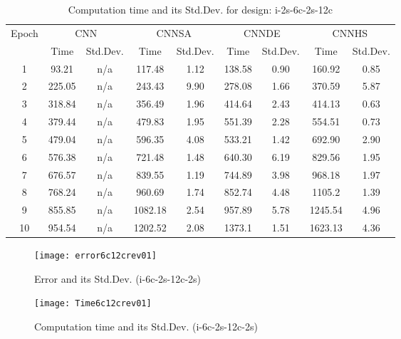 \documentclass[10pt,letterpaper]{article}
\begin{document}
\begin{table}[]
\small
\caption{Computation time and its Std.Dev. for design: i-2s-6c-2s-12c}
\label{tab:my_label}

\begin{tabular}{c c c c c c c c c}
\hline
\multicolumn{1}{c}{\multirow{2}{*}{Epoch}} & \multicolumn{2}{c}{CNN} &
\multicolumn{2}{c}{CNNSA} & \multicolumn{2}{c}{CNNDE} & \multicolumn{2}{c}{CNNHS}\\
\cline{2-9}

\multicolumn{1}{r}{}       & \multicolumn{1}{c}{Time} & \multicolumn{1}{c}{Std.Dev.} &
\multicolumn{1}{c}{Time} & \multicolumn{1}{c}{Std.Dev.}  & \multicolumn{1}{c}{Time} &
\multicolumn{1}{c}{Std.Dev.} & \multicolumn{1}{c}{Time} & \multicolumn{1}{c}{Std.Dev.} \\
\hline

1		& 93.21  & n/a    & 117.48  & 1.12  & 138.58  & 0.90    & 160.92  & 0.85  \\
2 		& 225.05 & n/a    & 243.43  & 9.90  & 278.08  & 1.66    & 370.59  & 5.87  \\
3		& 318.84 & n/a    & 356.49  & 1.96  & 414.64  & 2.43    & 414.13  & 0.63  \\
4		& 379.44 & n/a    & 479.83  & 1.95  & 551.39  & 2.28 	& 554.51  & 0.73  \\
5		& 479.04 & n/a    & 596.35  & 4.08  & 533.21  & 1.42    & 692.90  & 2.90  \\
6		& 576.38 & n/a    & 721.48  & 1.48  & 640.30  & 6.19    & 829.56  & 1.95  \\
7 		& 676.57 & n/a    & 839.55  & 1.19  & 744.89  & 3.98    & 968.18  & 1.97  \\
8		& 768.24 & n/a    & 960.69  & 1.74  & 852.74  & 4.48    & 1105.2  & 1.39  \\
9		& 855.85 & n/a    & 1082.18 & 2.54  & 957.89  & 5.78    & 1245.54 & 4.96  \\
10		& 954.54 & n/a    & 1202.52 & 2.08  & 1373.1  & 1.51    & 1623.13 & 4.36 \\

\hline
\end{tabular}
\end{table}



\begin{figure}
\texttt{[image: error6c12crev01]}
\caption{Error and its Std.Dev. (i-6c-2s-12c-2s)}
\label{fig:my_label}
\end{figure}


\begin{figure}
    \texttt{[image: Time6c12crev01]}
    \caption{Computation time and its Std.Dev. (i-6c-2s-12c-2s)}
    \label{fig:my_label}
\end{figure}
\end{document}
